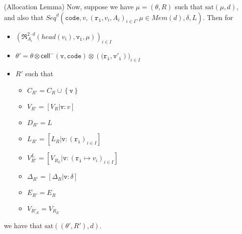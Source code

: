 \documentclass[preprint]{sigplanconf}
\newcommand{\setof}[1]{\left\{{#1}\right\}}
\newcommand{\term}[1]{\ensuremath{\mathtt{{#1}}}}
\newcommand{\Mem}[1]{\mathit{Mem}(#1)}
\newcommand{\Seq}{\mathit{Seq}}
\newcommand{\cellminus}[2]{\mathsf{cell}^{-}({#1}, {#2})}
\newcommand{\head}[1]{\mathit{head}(#1)}
\newcommand{\satisfy}[2]{\mathrm{sat}({#1},{#2})}
\begin{document}
\begin{lemma}{(Allocation Lemma)}
\noindent Now, suppose we have $\mu = (\theta, R)$ such that $\satisfy{\mu}{d}$, and also that 
$\Seq^d(\term{code}, v, (\term{r_i}, v_i, A_i)_{i \in I}, \mu \in \Mem{d}, \delta, L)$. Then
for 
\begin{itemize}
\item $(\Re^{2\cdot d}_{A_i}(\head{v_i}, \term{v_i}, \mu))_{i \in I}$
\item $\theta' = \theta \otimes \cellminus{\term{v}}{\term{code}} \otimes (\mathsf(\term{r_i}, \term{v'_i}))_{i \in I}$
\item $R'$ such that
  \begin{itemize}
    \item $C_{R'} = C_R \cup \setof{\term{v}}$
    \item $V_{R'} = [V_R|\term{v}:v]$
    \item $D_{R'} = L$
    \item $L_{R'} = [L_R|\term{v}:(\term{r_i})_{i \in I}]$
    \item $V^L_{R'} = [V_R_L|\term{v} : (\term{r_i} \mapsto v_i)_{i \in I}]$
    \item $\Delta_{R'} = [\Delta_R|\term{v} : \delta]$
    \item $E_{R'} = E_R$
    \item $V_{R'}_E = V_R_E$ 
  \end{itemize}
\end{itemize}
\noindent we have that $\satisfy{(\theta', R')}{d}$. 
\end{lemma}
\end{document}
